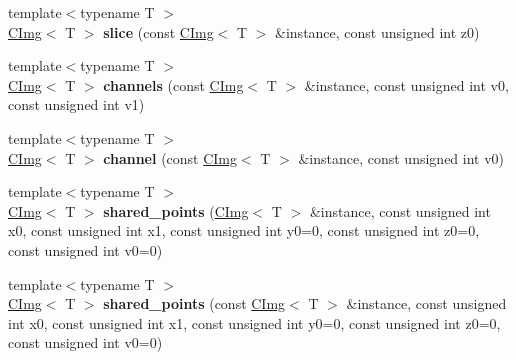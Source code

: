 \begin{DoxyCompactItemize}
\item 
\hypertarget{namespacecimg__library_ae1368c3f8ca39d4859a96fa1a6a1afd8}{{\footnotesize template$<$typename T $>$ }\\\hyperlink{structcimg__library_1_1_c_img}{C\-Img}$<$ T $>$ {\bfseries slice} (const \hyperlink{structcimg__library_1_1_c_img}{C\-Img}$<$ T $>$ \&instance, const unsigned int z0)}\label{namespacecimg__library_ae1368c3f8ca39d4859a96fa1a6a1afd8}

\item 
\hypertarget{namespacecimg__library_a9831a5ca9eec538356793baec5498c5d}{{\footnotesize template$<$typename T $>$ }\\\hyperlink{structcimg__library_1_1_c_img}{C\-Img}$<$ T $>$ {\bfseries channels} (const \hyperlink{structcimg__library_1_1_c_img}{C\-Img}$<$ T $>$ \&instance, const unsigned int v0, const unsigned int v1)}\label{namespacecimg__library_a9831a5ca9eec538356793baec5498c5d}

\item 
\hypertarget{namespacecimg__library_a248344795edb94d07234077c8b17c8fa}{{\footnotesize template$<$typename T $>$ }\\\hyperlink{structcimg__library_1_1_c_img}{C\-Img}$<$ T $>$ {\bfseries channel} (const \hyperlink{structcimg__library_1_1_c_img}{C\-Img}$<$ T $>$ \&instance, const unsigned int v0)}\label{namespacecimg__library_a248344795edb94d07234077c8b17c8fa}

\item 
\hypertarget{namespacecimg__library_a922e75497067319a06ba076607f95b09}{{\footnotesize template$<$typename T $>$ }\\\hyperlink{structcimg__library_1_1_c_img}{C\-Img}$<$ T $>$ {\bfseries shared\-\_\-points} (\hyperlink{structcimg__library_1_1_c_img}{C\-Img}$<$ T $>$ \&instance, const unsigned int x0, const unsigned int x1, const unsigned int y0=0, const unsigned int z0=0, const unsigned int v0=0)}\label{namespacecimg__library_a922e75497067319a06ba076607f95b09}

\item 
\hypertarget{namespacecimg__library_a974c22df35de0515018db72d7cc200d0}{{\footnotesize template$<$typename T $>$ }\\\hyperlink{structcimg__library_1_1_c_img}{C\-Img}$<$ T $>$ {\bfseries shared\-\_\-points} (const \hyperlink{structcimg__library_1_1_c_img}{C\-Img}$<$ T $>$ \&instance, const unsigned int x0, const unsigned int x1, const unsigned int y0=0, const unsigned int z0=0, const unsigned int v0=0)}\label{namespacecimg__library_a974c22df35de0515018db72d7cc200d0}


\end{DoxyCompactItemize}

